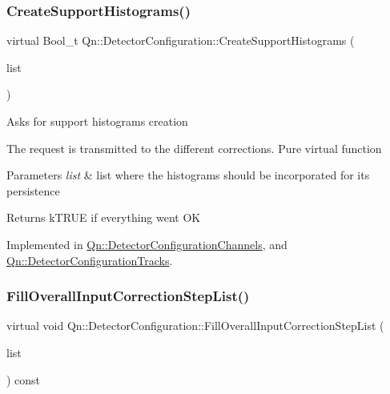 \subsubsection{\texorpdfstring{Create\+Support\+Histograms()}{CreateSupportHistograms()}}
{\footnotesize\ttfamily virtual Bool\+\_\+t Qn\+::\+Detector\+Configuration\+::\+Create\+Support\+Histograms (\begin{DoxyParamCaption}\item[{T\+List $\ast$}]{list }\end{DoxyParamCaption})\hspace{0.3cm}{\ttfamily [pure virtual]}}

Asks for support histograms creation

The request is transmitted to the different corrections. Pure virtual function 
\begin{DoxyParams}{Parameters}
{\em list} & list where the histograms should be incorporated for its persistence \\
\hline
\end{DoxyParams}
\begin{DoxyReturn}{Returns}
k\+T\+R\+UE if everything went OK 
\end{DoxyReturn}


Implemented in \mbox{\hyperlink{classQn_1_1DetectorConfigurationChannels_a68e68df13b56e3e9f55adc8cae0a505d}{Qn\+::\+Detector\+Configuration\+Channels}}, and \mbox{\hyperlink{classQn_1_1DetectorConfigurationTracks_ab32b2790ce27053d640e2682dcc9223d}{Qn\+::\+Detector\+Configuration\+Tracks}}.

\mbox{\label{classQn_1_1DetectorConfiguration_a76e173f938b886b5575597d9464698b4}} 
\subsubsection{\texorpdfstring{Fill\+Overall\+Input\+Correction\+Step\+List()}{FillOverallInputCorrectionStepList()}}
{\footnotesize\ttfamily virtual void Qn\+::\+Detector\+Configuration\+::\+Fill\+Overall\+Input\+Correction\+Step\+List (\begin{DoxyParamCaption}\item[{T\+List $\ast$}]{list }\end{DoxyParamCaption}) const\hspace{0.3cm}{\ttfamily [pure virtual]}}

